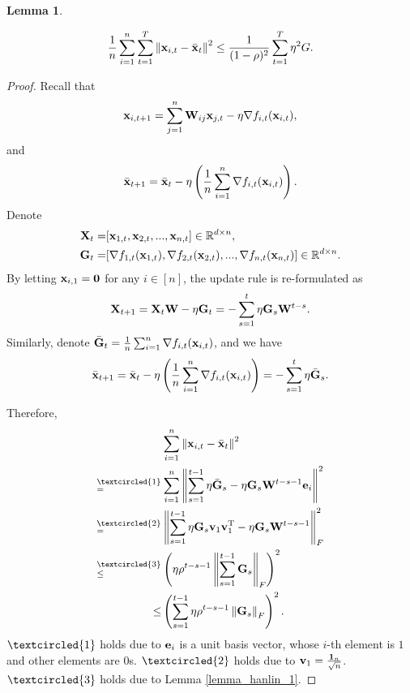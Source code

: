 \documentclass{article}
\newtheorem{Lemma}{\bf{Lemma}}
\begin{document}
\begin{Lemma}
\label{lemma_x_variance_norm_square}

\begin{align}
\nonumber
\frac{1}{n}\sum_{i=1}^n \sum_{t=1}^T \left\lVert{\bf x}_{i,t} - \bar{{\bf x}}_t\right\rVert^2 \le \frac{1}{(1-\rho)^2} \sum_{t=1}^T \eta^2 G.
\end{align}

\end{Lemma}
\begin{proof}


Recall that 
\begin{align}
\nonumber
{\bf x}_{i,t+1} = \sum_{j=1}^n {\bf W}_{ij}{\bf x}_{j,t} - \eta \nabla f_{i,t}({\bf x}_{i,t}),
\end{align} and 
\begin{align}
\nonumber
\bar{{\bf x}}_{t+1} = \bar{{\bf x}}_t - \eta \left( \frac{1}{n}\sum_{i=1}^n \nabla f_{i,t}({\bf x}_{i,t}) \right).
\end{align} Denote 
\begin{align}
\nonumber
{\bf X}_t = &  [{\bf x}_{1,t}, {\bf x}_{2,t}, ..., {\bf x}_{n,t}] \in \mathbb{R}^{d\times n}, \\ \nonumber
{\bf G}_t = & [\nabla f_{1,t}({\bf x}_{1,t}), \nabla f_{2,t}({\bf x}_{2,t}), ..., \nabla f_{n,t}({\bf x}_{n,t})] \in \mathbb{R}^{d\times n}.
\end{align} By letting ${\bf x}_{i,1} = {\bf 0}$ for any $i\in[n]$, the update rule is re-formulated as 
\begin{align}
\nonumber
{\bf X}_{t+1} = {\bf X}_t {\bf W} - \eta {\bf G}_t = - \sum_{s=1}^t \eta {\bf G}_s {\bf W}^{t-s}. 
\end{align} Similarly, denote $\bar{{\bf G}}_t = \frac{1}{n}\sum_{i=1}^n \nabla f_{i,t}({\bf x}_{i,t})$, and we have
\begin{align}
\bar{{\bf x}}_{t+1} = \bar{{\bf x}}_t - \eta \left( \frac{1}{n}\sum_{i=1}^n \nabla f_{i,t}({\bf x}_{i,t}) \right) = - \sum_{s=1}^t \eta \bar{{\bf G}}_s. 
\end{align}


Therefore, 
\begin{align}
\nonumber
& \sum_{i=1}^n \lrnorm{\x_{i,t} - \bar{\x}_t}^2 \\ \nonumber
\refabovecir{=}{\textcircled{1}} & \sum_{i=1}^n \lrnorm{ \sum_{s=1}^{t-1} \eta \bar{\G}_s - \eta \G_s \W^{t-s-1}\e_i }^2   \\ \nonumber
\refabovecir{=}{\textcircled{2}} & \lrnorm{ \sum_{s=1}^{t-1} \eta \G_s\v_1 \v_1\Tr - \eta \G_s \W^{t-s-1} }^2_F   \\ \nonumber
\refabovecir{\le}{\textcircled{3}} & \lrincir{ \eta \rho^{t-s-1} \lrnorm{\sum_{s=1}^{t-1}\G_s}_F}^2 \\ \nonumber
\le & \lrincir{ \sum_{s=1}^{t-1} \eta \rho^{t-s-1} \lrnorm{\G_s}_F}^2.
\end{align} $\textcircled{1}$ holds due to ${\bf e}_i$ is a unit basis vector, whose $i$-th element is $1$ and other elements are $0$s. $\textcircled{2}$ holds due to ${\bf v}_1 = \frac{{\bf 1}_n}{\sqrt{n}}$. $\textcircled{3}$ holds due to Lemma \ref{lemma_hanlin_1}. 


\end{proof}
\end{document}
